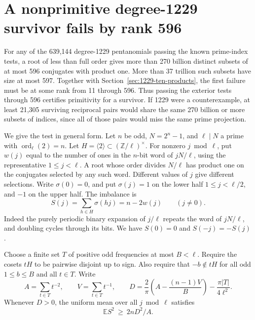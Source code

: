 \documentclass[11pt]{article}
\newcommand{\ord}{\operatorname{ord}}
\begin{document}
\section{A nonprimitive degree-1229 survivor fails by rank 596}
\label{sec:1229-failure-ranks}
For any of the 639,144 degree-1229 pentanomials passing the known
prime-index tests, a root of less than full order gives more than
270 billion distinct subsets of at most 596 conjugates with product
one. More than 37 trillion such subsets have size at most 597.
Together with Section~\ref{sec:1229-ten-products}, the first failure
must be at some rank from 11 through 596. Thus passing the exterior
tests through 596 certifies primitivity for a survivor. If 1229 were
a counterexample, at least 21,305 surviving reciprocal pairs would
share the same 270 billion or more subsets of indices, since all of
those pairs would miss the same prime projection.

We give the test in general form. Let \(n\) be odd, \(N=2^n-1\),
and \(\ell\mid N\) a prime with \(\ord_\ell(2)=n\). Let
\(H=\langle 2\rangle\subset(\mathbb Z/\ell)^\times\).
For nonzero \(j\bmod\ell\), put \(w(j)\) equal to the number of ones in
the \(n\)-bit word of \(jN/\ell\), using the representative
\(1\le j<\ell\). A root whose order divides \(N/\ell\) has product
one on the conjugates selected by any such word. Different values of
\(j\) give different selections. Write \(\sigma(0)=0\), and put
\(\sigma(j)=1\) on the lower half \(1\le j<\ell/2\), and \(-1\) on
the upper half. The imbalance is
\[
        S(j)=\sum_{h\in H}\sigma(hj)= n-2w(j)\qquad (j\ne0).
\]
Indeed the purely periodic binary expansion of \(j/\ell\) repeats
the word of \(jN/\ell\), and doubling cycles through its bits.
We have \(S(0)=0\) and \(S(-j)=-S(j)\).

Choose a finite set \(T\) of positive odd frequencies at most \(B<\ell\).
Require the cosets \(tH\) to be pairwise disjoint up to sign.
Also require that \(-b\notin tH\) for all odd \(1\le b\le B\) and
all \(t\in T\). Write
\[
 A=\sum_{t\in T}t^{-2},\qquad V=\sum_{t\in T}t^{-1},\qquad
 D=\frac{2}{\pi}\left(A-\frac{(n-1)V}{B}\right)
       -\frac{\pi |T|}{4\ell^2}.
\]
Whenever \(D>0\), the uniform mean over all \(j\bmod\ell\) satisfies
\[
                        \mathbb E S^2\ \ge\ 2nD^2/A.                 \tag{*}
\]
\end{document}
